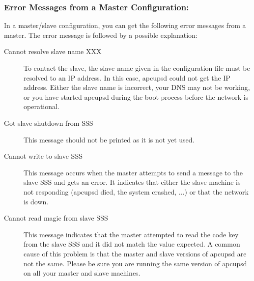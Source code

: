 {{{{{{{{\label{Error-Messages-from-a-Master-Configuration}

\subsubsection*{Error Messages from a Master Configuration:}

In a master/slave configuration, you can get the following error messages from
a master. The error message is followed by a possible explanation: 

\begin{description}
\item[Cannot resolve slave name XXX]
   \label{Cannot-resolve-slave-name-XXX}
To contact the slave, the slave name given in the configuration file must be
resolved to an IP address. In this case, apcupsd could not get the IP address.
Either the slave name is incorrect, your DNS may not be working, or you have
started apcupsd during the boot process before the network is operational. 

\item[Got slave shutdown from SSS]
   \label{Got-slave-shutdown-from-SSS}
This message should not be printed as it is not yet used. 

\item[Cannot write to slave SSS]
   \label{Cannot-write-to-slave-SSS}
This message occurs when the master attempts to send a message to the slave
SSS and gets an error. It indicates that either the slave machine is not
responding (apcupsd died, the system crashed, ...) or that the network is
down. 

\item[Cannot read magic from slave SSS]
   \label{Cannot-read-magic-from-slave-SSS}
This message indicates that the master attempted to read the code key from the
slave SSS and it did not match the value expected. A common cause of this
problem is that the master and slave versions of apcupsd are not the same.
Please be sure you are running the same version of apcupsd on all your master
and slave machines. 


\end{description}}}}}}}}}

